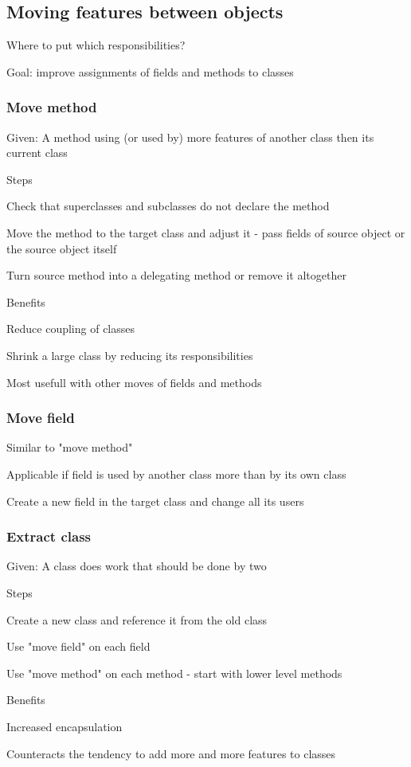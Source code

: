 \documentclass[10pt]{article}
\begin{document}
\subsection{Moving features between objects}
\enumstart
	\item Where to put which responsibilities?
	\item Goal: improve assignments of fields and methods to classes
\enumend

\subsubsection{Move method}
\enumstart
	\item Given: A method using (or used by) more features of another class then its current class
	\item Steps
	\enumstart
		\item Check that superclasses and subclasses do not declare the method
		\item Move the method to the target class and adjust it - pass fields of source object or the source object itself
		\item Turn source method into a delegating method or remove it altogether
	\enumend
	\item Benefits
	\enumstart
		\item Reduce coupling of classes
		\item Shrink a large class by reducing its responsibilities
		\item Most usefull with other moves of fields and methods
	\enumend
\enumend

\subsubsection{Move field}
\enumstart
	\item Similar to "move method"
	\item Applicable if field is used by another class more than by its own class
	\item Create a new field in the target class and change all its users
\enumend

\subsubsection{Extract class}
\enumstart
	\item Given: A class does work that should be done by two
	\item Steps
	\enumstart
		\item Create a new class and reference it from the old class
		\item Use "move field" on each field
		\item Use "move method" on each method - start with lower level methods
	\enumend
	\item Benefits
	\enumstart
		\item Increased encapsulation
		\item Counteracts the tendency to add more and more features to classes
	\enumend
\enumend
\end{document}
